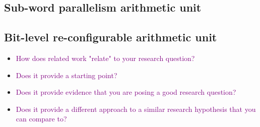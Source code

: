 \subsection{Sub-word parallelism arithmetic unit}
\subsection{Bit-level re-configurable arithmetic unit}
\begin{itemize}
    \item \textcolor{purple}{How does related work "relate" to your research question?}
    \item \textcolor{purple}{Does it provide a starting point?}
    \item \textcolor{purple}{Does it provide evidence that you are posing a good research question?}
    \item \textcolor{purple}{Does it provide a different approach to a similar research hypothesis that you can compare to?}
\end{itemize}